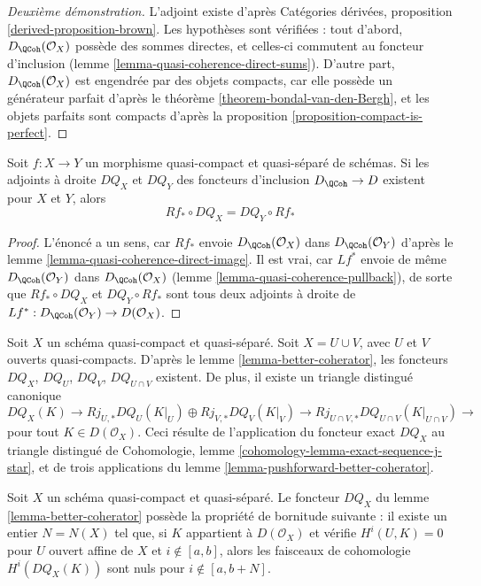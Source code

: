 \begin{proof}[Deuxième démonstration]
L'adjoint existe d'après Catégories dérivées, proposition
\ref{derived-proposition-brown}. Les hypothèses sont vérifiées :
tout d'abord, $D_\QCoh(\mathcal{O}_X)$ possède des sommes directes,
et celles-ci commutent au foncteur d'inclusion
(lemme \ref{lemma-quasi-coherence-direct-sums}).
D'autre part, $D_\QCoh(\mathcal{O}_X)$
est engendrée par des objets compacts, car elle possède un générateur
parfait d'après le théorème \ref{theorem-bondal-van-den-Bergh},
et les objets parfaits sont compacts d'après la
proposition \ref{proposition-compact-is-perfect}.
\end{proof}

\begin{lemma}
\label{lemma-pushforward-better-coherator}
Soit $f : X \to Y$ un morphisme quasi-compact et quasi-séparé
de schémas. Si les adjoints à droite $DQ_X$ et $DQ_Y$
des foncteurs d'inclusion $D_\QCoh \to D$ existent pour $X$ et $Y$, alors
$$
Rf_* \circ DQ_X = DQ_Y \circ Rf_*
$$
\end{lemma}

\begin{proof}
L'énoncé a un sens, car $Rf_*$ envoie
$D_\QCoh(\mathcal{O}_X)$ dans $D_\QCoh(\mathcal{O}_Y)$ d'après le
lemme \ref{lemma-quasi-coherence-direct-image}.
Il est vrai, car $Lf^*$ envoie de même
$D_\QCoh(\mathcal{O}_Y)$ dans $D_\QCoh(\mathcal{O}_X)$
(lemme \ref{lemma-quasi-coherence-pullback}),
de sorte que $Rf_* \circ DQ_X$ et $DQ_Y \circ Rf_*$
sont tous deux adjoints à droite de $Lf^* : D_\QCoh(\mathcal{O}_Y) \to D(\mathcal{O}_X)$.
\end{proof}

\begin{remark}
\label{remark-explain-consequence}
Soit $X$ un schéma quasi-compact et quasi-séparé.
Soit $X = U \cup V$, avec $U$ et $V$ ouverts quasi-compacts.
D'après le lemme \ref{lemma-better-coherator}, les foncteurs
$DQ_X$, $DQ_U$, $DQ_V$, $DQ_{U \cap V}$ existent. De plus, il existe un
triangle distingué canonique
$$
DQ_X(K) \to Rj_{U, *}DQ_U(K|_U) \oplus Rj_{V, *}DQ_V(K|_V)
\to Rj_{U \cap V, *}DQ_{U \cap V}(K|_{U \cap V}) \to
$$
pour tout $K \in D(\mathcal{O}_X)$. Ceci résulte de l'application du
foncteur exact $DQ_X$ au triangle distingué de
Cohomologie, lemme \ref{cohomology-lemma-exact-sequence-j-star},
et de trois applications du lemme \ref{lemma-pushforward-better-coherator}.
\end{remark}

\begin{lemma}
\label{lemma-boundedness-better-coherator}
Soit $X$ un schéma quasi-compact et quasi-séparé. Le foncteur
$DQ_X$ du lemme \ref{lemma-better-coherator}
possède la propriété de bornitude suivante :
il existe un entier $N = N(X)$ tel que, si
$K$ appartient à $D(\mathcal{O}_X)$ et vérifie
$H^i(U, K) = 0$ pour $U$ ouvert affine de $X$ et $i \not \in [a, b]$, alors
les faisceaux de cohomologie $H^i(DQ_X(K))$ sont nuls pour
$i \not \in [a, b + N]$.
\end{lemma}

